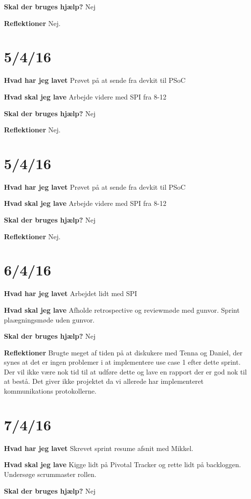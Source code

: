\documentclass{article}
\begin{document}
	\textbf{Skal der bruges hjælp?}
	Nej
	
	\textbf{Reflektioner}
	Nej.
	
	\section{5/4/16}
	\textbf{Hvad har jeg lavet}
	Prøvet på at sende fra devkit til PSoC
	
	\textbf{Hvad skal jeg lave}
	Arbejde videre med SPI fra 8-12
	
	\textbf{Skal der bruges hjælp?}
	Nej
	
	\textbf{Reflektioner}
	Nej.
	
	\section{5/4/16}
	\textbf{Hvad har jeg lavet}
	Prøvet på at sende fra devkit til PSoC
	
	\textbf{Hvad skal jeg lave}
	Arbejde videre med SPI fra 8-12
	
	\textbf{Skal der bruges hjælp?}
	Nej
	
	\textbf{Reflektioner}
	Nej.
	
	\section{6/4/16}
	\textbf{Hvad har jeg lavet}
	Arbejdet lidt med SPI
	
	\textbf{Hvad skal jeg lave}
	Afholde retrospective og reviewmøde med gunvor. 
	Sprint plaægningsmøde uden gunvor.
	
	\textbf{Skal der bruges hjælp?}
	Nej
	
	\textbf{Reflektioner}
	Brugte meget af tiden på at diskukere med Tenna og Daniel, der synes at det er ingen problemer i at implementere use case 1 efter dette sprint. Der vil ikke være nok tid til at udføre dette og lave en rapport der er god nok til at bestå. Det giver ikke projektet da vi allerede har implementeret kommunikations protokollerne. 
	
	\section{7/4/16}
	\textbf{Hvad har jeg lavet}
	Skrevet sprint resume afsnit med Mikkel.
	
	\textbf{Hvad skal jeg lave}
	Kigge lidt på Pivotal Tracker og rette lidt på backloggen. Undersøge scrummaster rollen.
	
	\textbf{Skal der bruges hjælp?}
	Nej
	
\end{document}
